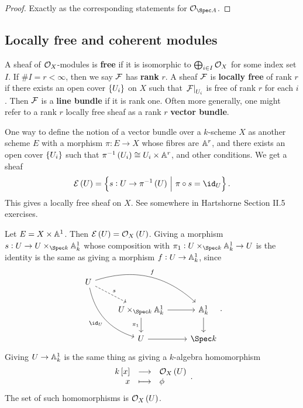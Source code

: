 \begin{proof}
Exactly as the corresponding statements for $ \OOO_{\Spec A} $.
\end{proof}

\subsection{Locally free and coherent modules}

\begin{definition*}
A sheaf of $ \OOO_X $-modules is \textbf{free} if it is isomorphic to $ \bigoplus_{i \in I} \OOO_X $ for some index set $ I $. If $ \#I = r < \infty $, then we say $ \FFF $ has \textbf{rank} $ r $. A sheaf $ \FFF $ is \textbf{locally free} of rank $ r $ if there exists an open cover $ \cbr{U_i} $ on $ X $ such that $ \eval{\FFF}_{U_i} $ is free of rank $ r $ for each $ i $. Then $ \FFF $ is a \textbf{line bundle} if it is rank one. Often more generally, one might refer to a rank $ r $ locally free sheaf as a rank $ r $ \textbf{vector bundle}.
\end{definition*}


\begin{remark*}
One way to define the notion of a vector bundle over a $ k $-scheme $ X $ as another scheme $ E $ with a morphism $ \pi : E \to X $ whose fibres are $ \AA^r $, and there exists an open cover $ \cbr{U_i} $ such that $ \pi^{-1}\br{U_i} \cong U_i \times \AA^r $, and other conditions. We get a sheaf
$$ \EEE\br{U} = \cbr{s : U \to \pi^{-1}\br{U} \st \pi \circ s = \id_U}. $$
This gives a locally free sheaf on $ X $. See somewhere in Hartshorne Section II.5 exercises.
\end{remark*}

\begin{example*}
Let $ E = X \times \AA^1 $. Then $ \EEE\br{U} = \OOO_X\br{U} $. Giving a morphism $ s : U \to U \times_{\Spec k} \AA_k^1 $ whose composition with $ \pi_1 : U \times_{\Spec k} \AA_k^1 \to U $ is the identity is the same as giving a morphism $ f : U \to \AA_k^1 $, since
$$
\begin{tikzcd}
U \arrow[dashed]{dr}{s} \arrow[bend left=30]{drr}{f} \arrow[bend right=30]{ddr}[swap]{\id_U} & & \\
& U \times_{\Spec k} \AA_k^1 \arrow{r} \arrow{d}[swap]{\pi_1} & \AA_k^1 \arrow{d} \\
& U \arrow{r} & \Spec k
\end{tikzcd}.
$$
Giving $ U \to \AA_k^1 $ is the same thing as giving a $ k $-algebra homomorphism
$$ \function{k\sbr{x}}{\OOO_X\br{U}}{x}{\phi}. $$
The set of such homomorphisms is $ \OOO_X\br{U} $.
\end{example*}

